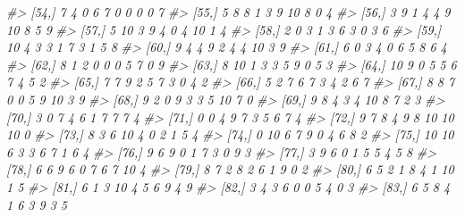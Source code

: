 \documentclass[
]{book}
\newenvironment{Shaded}{\begin{snugshade}}{\end{snugshade}}
\newcommand{\CommentTok}[1]{\textcolor[rgb]{0.56,0.35,0.01}{\textit{#1}}}
\begin{document}
\begin{Shaded}
\begin{Highlighting}[]
\CommentTok{\#\textgreater{}  [54,]    7    4    0    6    7    0    0    0    0     7}
\CommentTok{\#\textgreater{}  [55,]    5    8    8    1    3    9   10    8    0     4}
\CommentTok{\#\textgreater{}  [56,]    3    9    1    4    4    9   10    8    5     9}
\CommentTok{\#\textgreater{}  [57,]    5   10    3    9    4    0    4   10    1     4}
\CommentTok{\#\textgreater{}  [58,]    2    0    3    1    3    6    3    0    3     6}
\CommentTok{\#\textgreater{}  [59,]   10    4    3    3    1    7    3    1    5     8}
\CommentTok{\#\textgreater{}  [60,]    9    4    4    9    2    4    4   10    3     9}
\CommentTok{\#\textgreater{}  [61,]    6    0    3    4    0    6    5    8    6     4}
\CommentTok{\#\textgreater{}  [62,]    8    1    2    0    0    0    5    7    0     9}
\CommentTok{\#\textgreater{}  [63,]    8   10    1    3    3    5    9    0    5     3}
\CommentTok{\#\textgreater{}  [64,]   10    9    0    5    5    6    7    4    5     2}
\CommentTok{\#\textgreater{}  [65,]    7    7    9    2    5    7    3    0    4     2}
\CommentTok{\#\textgreater{}  [66,]    5    2    7    6    7    3    4    2    6     7}
\CommentTok{\#\textgreater{}  [67,]    8    8    7    0    0    5    9   10    3     9}
\CommentTok{\#\textgreater{}  [68,]    9    2    0    9    3    3    5   10    7     0}
\CommentTok{\#\textgreater{}  [69,]    9    8    4    3    4   10    8    7    2     3}
\CommentTok{\#\textgreater{}  [70,]    3    0    7    4    6    1    7    7    7     4}
\CommentTok{\#\textgreater{}  [71,]    0    0    4    9    7    3    5    6    7     4}
\CommentTok{\#\textgreater{}  [72,]    9    7    8    4    9    8   10   10   10     0}
\CommentTok{\#\textgreater{}  [73,]    8    3    6   10    4    0    2    1    5     4}
\CommentTok{\#\textgreater{}  [74,]    0   10    6    7    9    0    4    6    8     2}
\CommentTok{\#\textgreater{}  [75,]   10   10    6    3    3    6    7    1    6     4}
\CommentTok{\#\textgreater{}  [76,]    9    6    9    0    1    7    3    0    9     3}
\CommentTok{\#\textgreater{}  [77,]    3    9    6    0    1    5    5    4    5     8}
\CommentTok{\#\textgreater{}  [78,]    6    6    9    6    0    7    6    7   10     4}
\CommentTok{\#\textgreater{}  [79,]    8    7    2    8    2    6    1    9    0     2}
\CommentTok{\#\textgreater{}  [80,]    6    5    2    1    8    4    1   10    1     5}
\CommentTok{\#\textgreater{}  [81,]    6    1    3   10    4    5    6    9    4     9}
\CommentTok{\#\textgreater{}  [82,]    3    4    3    6    0    0    5    4    0     3}
\CommentTok{\#\textgreater{}  [83,]    6    5    8    4    1    6    3    9    3     5}

\end{Highlighting}
\end{Shaded}
\end{document}
